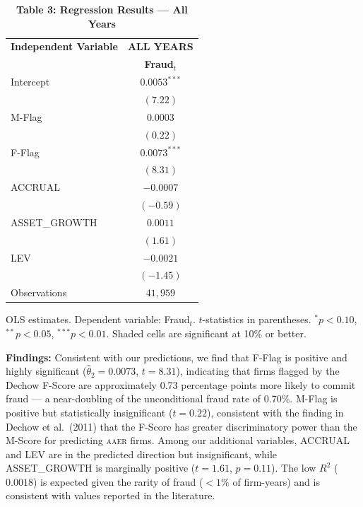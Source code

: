 \documentclass[12pt]{article}
\newcommand{\sig}[1]{\cellcolor{siggreen}#1}
\begin{document}
\begin{table}[h!]
\centering
\caption*{\textbf{Table 3: Regression Results — All Years}}
\begin{threeparttable}
\begin{tabular}{lc}
\toprule
\textbf{Independent Variable} & \textbf{ALL YEARS} \\
                               & \textbf{Fraud}$_t$ \\
\midrule
Intercept      & \sig{$0.0053^{***}$} \\
               & \sig{$(7.22)$}       \\[4pt]
M-Flag         & $0.0003$             \\
               & $(0.22)$             \\[4pt]
F-Flag         & \sig{$0.0073^{***}$} \\
               & \sig{$(8.31)$}       \\[4pt]
ACCRUAL        & $-0.0007$            \\
               & $(-0.59)$            \\[4pt]
ASSET\_GROWTH  & $0.0011$             \\
               & $(1.61)$             \\[4pt]
LEV            & $-0.0021$            \\
               & $(-1.45)$            \\[6pt]
Observations   & $41{,}959$           \\
\bottomrule
\end{tabular}
\begin{tablenotes}
\small\item
OLS estimates. Dependent variable: Fraud$_t$. $t$-statistics in parentheses.
$^{*}p<0.10$, $^{**}p<0.05$, $^{***}p<0.01$. Shaded cells are significant at 10\% or better.
\end{tablenotes}
\end{threeparttable}
\end{table}

\noindent
\textbf{Findings:}
Consistent with our predictions, we find that F-Flag is positive and highly significant
($\hat{\theta}_2 = 0.0073$, $t = 8.31$), indicating that firms flagged by the Dechow
F-Score are approximately 0.73 percentage points more likely to commit fraud — a
near-doubling of the unconditional fraud rate of 0.70\%.
M-Flag is positive but statistically insignificant ($t = 0.22$), consistent with
the finding in Dechow et al.\ (2011) that the F-Score has greater discriminatory
power than the M-Score for predicting \textsc{aaer} firms.
Among our additional variables, ACCRUAL and LEV are in the predicted direction but
insignificant, while ASSET\_GROWTH is marginally positive ($t = 1.61$, $p = 0.11$).
The low $R^2$ ($0.0018$) is expected given the rarity of fraud ($<1\%$ of firm-years)
and is consistent with values reported in the literature.
\end{document}
